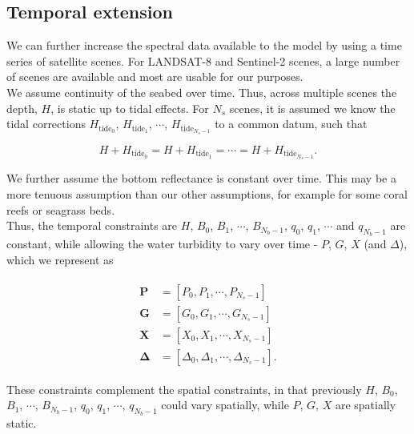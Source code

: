 \documentclass[12pt]{article}
\numberwithin{equation}{section}
\begin{document}
	\subsection{Temporal extension}

We can further increase the spectral data available to the model by using a time series of 
satellite scenes. For LANDSAT-8 and Sentinel-2 scenes, a large number of scenes are 
available and most are usable for our purposes. \\

We assume continuity of the seabed over time. Thus, across multiple scenes the depth, $H$, 
is static up to tidal effects. For $N_s$ scenes, it is assumed we know the tidal corrections 
$H_{\text{tide}_0}$, $H_{\text{tide}_1}$, $\cdots$, $H_{\text{tide}_{N_s-1}}$ to a 
common datum, such that 
\begin{linenomath}
\begin{equation*}
H + H_{\text{tide}_0} = H + H_{\text{tide}_1} = \cdots = H + H_{\text{tide}_{N_s-1}}.
\end{equation*}
\end{linenomath}

We further assume the bottom reflectance is constant over time. This may be a more tenuous 
assumption than our other assumptions, for example for some coral reefs or seagrass beds. \\

Thus, the temporal constraints are $H$, $B_0$, $B_1$, $\cdots$, $B_{N_b-1}$, $q_0$, $q_1$, 
$\cdots$ and $q_{N_b-1}$ are constant, while allowing the water turbidity to vary over 
time - $P$, $G$, $X$ (and $\Delta$), which we represent as 
\begin{linenomath}
\begin{align}
\begin{split}
\textbf{P} &= \left[P_0, P_1, \cdots, P_{N_s-1} \right] \\
\textbf{G} &= \left[G_0, G_1, \cdots, G_{N_s-1} \right] \\
\textbf{X} &= \left[X_0, X_1, \cdots, X_{N_s-1} \right] \\
\mathbf{\Delta} &= \left[\Delta_0, \Delta_1, \cdots, \Delta_{N_s-1} \right].
\end{split}\label{temporal_ext}
\end{align}
\end{linenomath}

These constraints complement the spatial constraints, in that previously $H$, $B_0$, $B_1$, 
$\cdots$, $B_{N_b-1}$, $q_0$, $q_1$, $\cdots$, $q_{N_b-1}$ could vary spatially, while 
$P$, $G$, $X$ are spatially static. 
\end{document}
